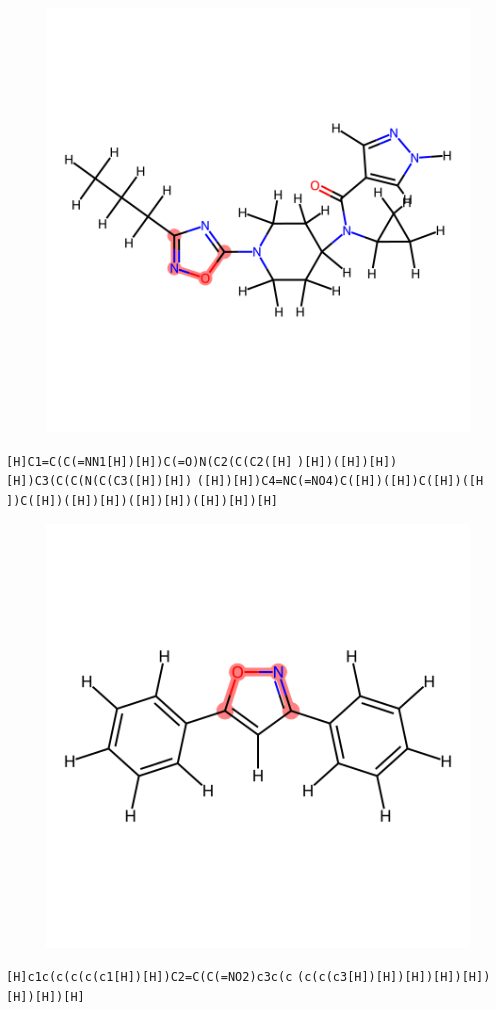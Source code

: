 \documentclass{article}
\begin{document}
\begin{figure}[ht]
\centering
    \includegraphics{mol04.png}
\end{figure}
\verb|[H]C1=C(C(=NN1[H])[H])C(=O)N(C2(C(C2([H]| \verb|)[H])([H])[H])[H])C3(C(C(N(C(C3([H])[H])| \verb|([H])[H])C4=NC(=NO4)C([H])([H])C([H])([H| \verb|])C([H])([H])[H])([H])[H])([H])[H])[H]|

\begin{figure}[ht]
\centering
    \includegraphics{mol05.png}
\end{figure}
\verb|[H]c1c(c(c(c(c1[H])[H])C2=C(C(=NO2)c3c(c| \verb|(c(c(c3[H])[H])[H])[H])[H])[H])[H])[H]|
\end{document}
